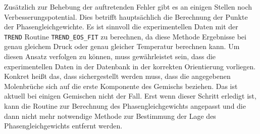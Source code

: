 \documentclass[../thesis.tex]{subfiles}
\begin{document}
Zusätzlich zur Behebung der auftretenden Fehler gibt es an einigen Stellen noch Verbesserungspotential. Dies betrifft hauptsächlich die Berechnung der Punkte der Phasengleichgewichte. Es ist sinnvoll die experimentellen Daten mit der \texttt{TREND} Routine \texttt{TREND\_EOS\_FIT} zu berechnen, da diese Methode Ergebnisse bei genau gleichem Druck oder genau gleicher Temperatur berechnen kann. Um diesen Ansatz verfolgen zu können, muss gewährleistet sein, dass die experimentellen Daten in der Datenbank in der korrekten Orientierung vorliegen. Konkret heißt das, dass sichergestellt werden muss, dass die angegebenen Molenbrüche sich auf die erste Komponente des Gemischs beziehen. Das ist aktuell bei einigen Gemischen nicht der Fall. Erst wenn dieser Schritt erledigt ist, kann die Routine zur Berechnung des Phasengleichgewichts angepasst und die dann nicht mehr notwendige Methode zur Bestimmung der Lage des Phasengleichgewichts entfernt werden. 
\end{document}
